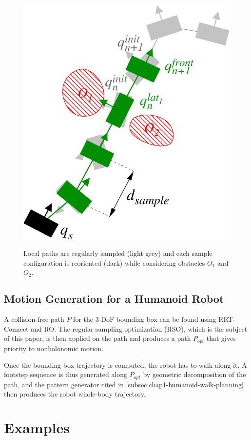 \begin{figure}
  \centering
      {\includegraphics[width = 0.75\linewidth]
        {src/chap1-path-optimization/hash-direct-path.pdf}}
      \caption{Local paths are regularly sampled (light grey) and each
        sample configuration is reoriented (dark) while considering
        obstacles $O_1$ and $O_2$.}
      \label{fig:chap1-hash-direct-path}
\end{figure}

\subsection{Motion Generation for a Humanoid Robot}

A collision-free path $P$ for the 3-DoF bounding box can be found
using RRT-Connect and RO. The regular sampling optimization (RSO),
which is the subject of this paper, is then applied on the path and
produces a path $P_{opt}$ that gives priority to nonholonomic motion.

Once the bounding box trajectory is computed, the robot has to walk
along it. A footstep sequence is thus generated along $P_{opt}$ by
geometric decomposition of the path, and the pattern generator cited
in \autoref{subsec:chap1-humanoid-walk-planning} then produces the robot
whole-body trajectory.

\section{Examples}
\label{sec:chap1-examples}

